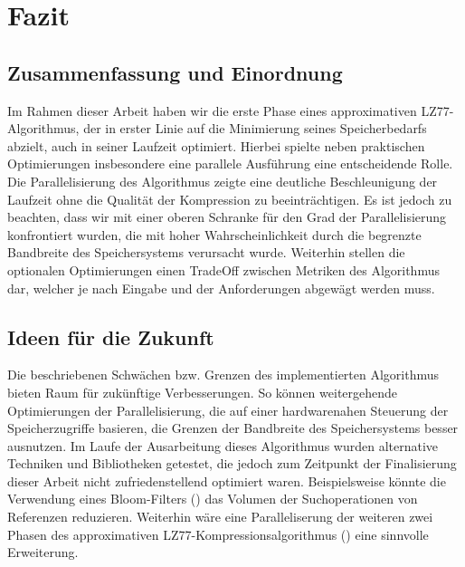 \chapter{Fazit}
\section{Zusammenfassung und Einordnung}
Im Rahmen dieser Arbeit haben wir die erste Phase eines approximativen LZ77- Algorithmus, der in erster Linie auf die Minimierung
seines Speicherbedarfs abzielt, auch in seiner Laufzeit optimiert. Hierbei spielte neben praktischen Optimierungen insbesondere eine 
parallele Ausführung eine entscheidende Rolle. Die Parallelisierung des Algorithmus zeigte eine deutliche Beschleunigung der Laufzeit ohne
die Qualität der Kompression zu beeinträchtigen. Es ist jedoch zu beachten, dass wir mit einer oberen Schranke für den Grad der Parallelisierung
konfrontiert wurden, die mit hoher Wahrscheinlichkeit durch die begrenzte Bandbreite des Speichersystems verursacht wurde. Weiterhin
stellen die optionalen Optimierungen einen TradeOff zwischen Metriken des Algorithmus dar, welcher je nach Eingabe und der Anforderungen
abgewägt werden muss.

\section{Ideen für die Zukunft}
Die beschriebenen Schwächen bzw. Grenzen des implementierten Algorithmus bieten Raum für zukünftige Verbesserungen. So können weitergehende
Optimierungen der Parallelisierung, die auf einer hardwarenahen Steuerung der Speicherzugriffe basieren, die Grenzen der Bandbreite des Speichersystems
besser ausnutzen. Im Laufe der Ausarbeitung dieses Algorithmus wurden alternative Techniken und Bibliotheken getestet, die jedoch zum Zeitpunkt
der Finalisierung dieser Arbeit nicht zufriedenstellend optimiert waren. Beispielsweise könnte die Verwendung eines Bloom-Filters (\cite{bloom}) das Volumen
der Suchoperationen von Referenzen reduzieren. Weiterhin wäre eine Paralleliserung der weiteren zwei Phasen des approximativen LZ77-Kompressionsalgorithmus
(\cite{ApproxLZ77}) eine sinnvolle Erweiterung.